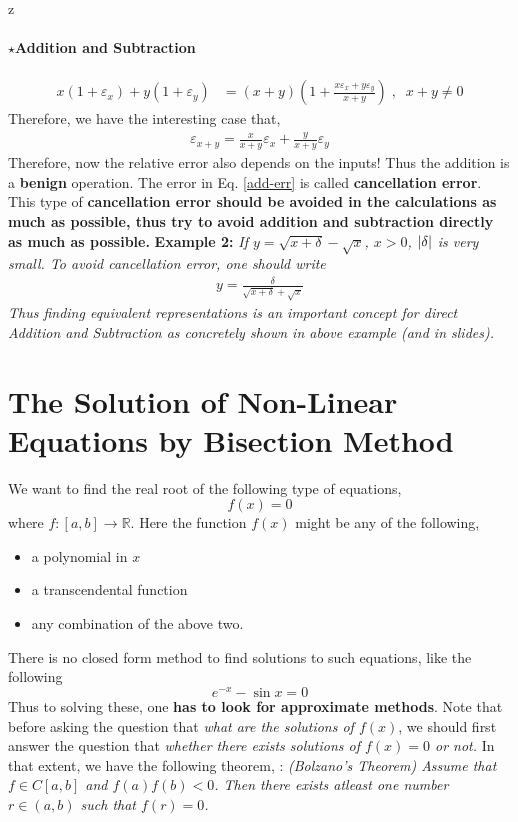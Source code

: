 z\documentclass[a4paper,12pt,twoside]{book}
\newcommand{\bb}[1]{\mathbb{#1}}
\newcommand{\nll}[0]{\newline\newline}
\newcommand{\tit}[1]{\textit{#1}}
\newcommand{\theor}[1]{\boxed{\textbf{\textit{Theorem \thechapter.#1}}}}
\DeclarePairedDelimiter\abs{\lvert}{\rvert}
\begin{document}
\subsubsection{$\star$Addition and Subtraction}
\begin{equation*}
	\begin{split}
		x\left( 1+\varepsilon_x \right) + y\left( 1+\varepsilon_y \right) &= \left( x+y \right) \left( 1+\frac{x\varepsilon_x + y\varepsilon_y}{x+y} \right)\;,\;\; x+y\neq 0
	\end{split}
\end{equation*}
Therefore, we have the interesting case that,
\begin{equation}
	\label{add-err}
	\begin{split}
		\boxed{\varepsilon_{x+y} = \frac{x}{x+y}\varepsilon_x + \frac{y}{x+y}\varepsilon_y}
	\end{split}
\end{equation}
Therefore, now the relative error also depends on the inputs! Thus the addition is a  \textbf{benign} operation. The error in Eq. \ref{add-err} is called \textbf{cancellation error}. This type of \textbf{cancellation error should be avoided in the calculations as much as possible, thus try to avoid addition and subtraction directly as much as possible.}
\newline\newline
\textbf{Example 2: } \textit{If $y = \sqrt{x+\delta} - \sqrt{x} $, $x>0$,  $\abs{\delta}$ is very small. To avoid cancellation error, one should write
\begin{equation*}
	\begin{split}
		y = \frac{\delta}{\sqrt{x+\delta} + \sqrt{x} }
	\end{split}
\end{equation*}
}
\textit{Thus finding equivalent representations is an important concept for direct Addition and Subtraction as concretely shown in above example (and in slides).}

\chapter{The Solution of Non-Linear Equations by Bisection Method}
We want to find the real root of the following type of equations,
\[f(x) = 0\]
where $f:[a,b] \rightarrow \bb{R}$. Here the function $f(x)$ might be any of the following,
\begin{itemize}
    \item {a polynomial in $x$}
    \item{a transcendental function }
    \item{any combination of the above two.}
\end{itemize}
There is no closed form method to find solutions to such equations, like the following
\[e^{-x} - \sin x = 0\]
Thus to solving these, one \textbf{has to look for approximate methods}.
\nll
Note that before asking the question that \tit{what are the solutions of $f(x)$}, we should first answer the question that \tit{whether there exists solutions of $f(x) = 0$ or not.} In that extent, we  have the following theorem,
\nll
\theor{0}   : \tit{(Bolzano's Theorem) Assume that $f \in C[a,b]$ and $f(a)f(b)<0$. Then there exists atleast one number $r\in(a,b)$ such that $f(r) = 0$.}
\end{document}
